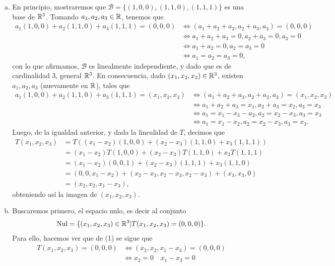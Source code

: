 \documentclass[11pt]{scrartcl}
\begin{document}
\begin{enumerate}[a)]
    \item En principio, mostraremos que $\mathcal{B}=\{(1,0,0),(1,1,0),(1,1,1)\}$ es una base de $\mathbb R^3$. Tomando $a_1,a_2,a_3 \in \mathbb R$,
    tenemos que
    \begin{align*}
        a_1(1,0,0)+a_2(1,1,0)+a_3(1,1,1) = (0,0,0) &\iff (a_1+a_2+a_3,a_2+a_3,a_3) = (0,0,0) \\
        &\iff a_1+a_2+a_3=0, a_2+a_3=0, a_3=0 \\
        &\iff a_1+a_2=0, a_2=a_3=0 \\
        &\iff a_1=a_2=a_3=0,
    \end{align*}
    con lo que afirmamos, $\mathcal{B}$ es linealmente independiente, y dado que es de cardinalidad 3, general $\mathbb R^3$. En consecuencia, dado
    $(x_1,x_2,x_3) \in \mathbb R^3$, existen $a_1,a_2,a_3$ (nuevamente en $\mathbb R$), tales que
    \begin{align*}
        a_1(1,0,0)+a_2(1,1,0)+a_3(1,1,1)=(x_1,x_2,x_3) &\iff (a_1+a_2+a_3,a_2+a_3,a_3)=(x_1,x_2,x_3) \\
        &\iff a_1+a_2+a_3=x_1, a_2+a_3=x_2, a_3=x_3 \\
        &\iff a_1=x_1-x_3-a_2, a_2=x_2-x_3, a_3=x_3 \\
        &\iff a_1=x_1-x_2, a_2=x_2-x_3, a_3=x_3.
    \end{align*}
    Luego, de la igualdad anterior, y dada la linealidad de $T$, decimos que
    \begin{align*}
        T(x_1,x_2,x_3) &= T((x_1-x_2)(1,0,0)+(x_2-x_3)(1,1,0)+x_3(1,1,1)) \\
        &= (x_1-x_2)T(1,0,0)+(x_2-x_3)T(1,1,0)+x_3T(1,1,1) \\
        &= (x_1-x_2)(0,0,1)+(x_2-x_3)(1,1,1)+x_3(1,1,0) \\
        &= (0,0,x_1-x_2) + (x_2-x_3,x_2-x_3,x_2-x_3)+(x_3,x_3,0) \\
        &= (x_2,x_2,x_1-x_3), \tag{1}
    \end{align*}
    obteniendo así la imagen de $(x_1,x_2,x_3)$.
    \item Buscaremos primero, el espacio nulo, es decir al conjunto 
    \[
    \text{Nul}=\{(x_1,x_2,x_3)\in \mathbb R^3|T(x_1,x_2,x_3)=(0,0,0)\}.
    \]
    Para ello, hacemos ver que de (1) se sigue que
    \begin{align*}
        T(x_1,x_2,x_3)=(0,0,0) &\iff (x_2,x_2,x_1-x_3)=(0,0,0) \\
        &\iff x_2=0 \quad x_1-x_3=0 \\

\end{align*}
\end{enumerate}
\end{document}
